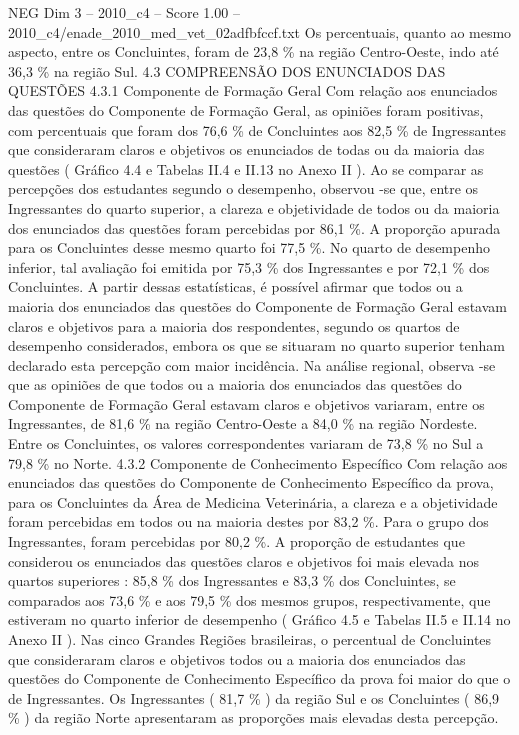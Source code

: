 \begin{textsample}{NEG Dim 3 – 2010\_c4 – Score 1.00 – 2010\_c4/enade\_2010\_med\_vet\_02adfbfccf.txt}
Os percentuais, quanto ao mesmo aspecto, entre os Concluintes, foram de 23,8 \% na região Centro-Oeste, indo até 36,3 \% na região Sul. 4.3 COMPREENSÃO DOS ENUNCIADOS DAS QUESTÕES 4.3.1 Componente de Formação Geral Com relação aos enunciados das questões do Componente de Formação Geral, as opiniões foram positivas, com percentuais que foram dos 76,6 \% de Concluintes aos 82,5 \% de Ingressantes que consideraram claros e objetivos os enunciados de todas ou da maioria das questões ( Gráfico 4.4 e Tabelas II.4 e II.13 no Anexo II ).
Ao se comparar as percepções dos estudantes segundo o desempenho, observou -se que, entre os Ingressantes do quarto superior, a clareza e objetividade de todos ou da maioria dos enunciados das questões foram percebidas por 86,1 \%.
A proporção apurada para os Concluintes desse mesmo quarto foi 77,5 \%.
No quarto de desempenho inferior, tal avaliação foi emitida por 75,3 \% dos Ingressantes e por 72,1 \% dos Concluintes.
A partir dessas estatísticas, é possível afirmar que todos ou a maioria dos enunciados das questões do Componente de Formação Geral estavam claros e objetivos para a maioria dos respondentes, segundo os quartos de desempenho considerados, embora os que se situaram no quarto superior tenham declarado esta percepção com maior incidência.
Na análise regional, observa -se que as opiniões de que todos ou a maioria dos enunciados das questões do Componente de Formação Geral estavam claros e objetivos variaram, entre os Ingressantes, de 81,6 \% na região Centro-Oeste a 84,0 \% na região Nordeste.
Entre os Concluintes, os valores correspondentes variaram de 73,8 \% no Sul a 79,8 \% no Norte. 4.3.2 Componente de Conhecimento Específico Com relação aos enunciados das questões do Componente de Conhecimento Específico da prova, para os Concluintes da Área de Medicina Veterinária, a clareza e a objetividade foram percebidas em todos ou na maioria destes por 83,2 \%.
Para o grupo dos Ingressantes, foram percebidas por 80,2 \%.
A proporção de estudantes que considerou os enunciados das questões claros e objetivos foi mais elevada nos quartos superiores : 85,8 \% dos Ingressantes e 83,3 \% dos Concluintes, se comparados aos 73,6 \% e aos 79,5 \% dos mesmos grupos, respectivamente, que estiveram no quarto inferior de desempenho ( Gráfico 4.5 e Tabelas II.5 e II.14 no Anexo II ).
Nas cinco Grandes Regiões brasileiras, o percentual de Concluintes que consideraram claros e objetivos todos ou a maioria dos enunciados das questões do Componente de Conhecimento Específico da prova foi maior do que o de Ingressantes.
Os Ingressantes ( 81,7 \% ) da região Sul e os Concluintes ( 86,9 \% ) da região Norte apresentaram as proporções mais elevadas desta percepção.

\end{textsample}
